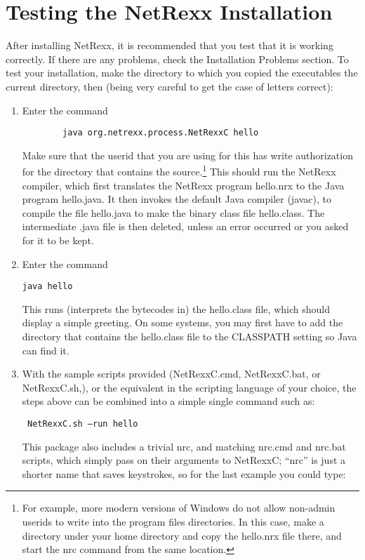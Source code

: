 \section{Testing the NetRexx Installation}\label{testing}
After installing NetRexx, it is recommended that you test that it is working correctly. If there are any problems, check the Installation Problems section. 
To test your installation, make the directory to which you copied the executables the current directory, then (being very careful to get the case of letters correct):
\begin{enumerate}
\item Enter the command
 \begin{verbatim}
        java org.netrexx.process.NetRexxC hello
\end{verbatim}
Make sure that the userid that you are using for this has write
authorization for the directory that contains the source.\footnote{For example,
more modern versions of Windows do not allow non-admin userids to
write into the program files directories. In this case, make a
directory under your home directory and copy the hello.nrx file there,
and start the nrc command from the same location.}
This should run the NetRexx compiler, which first translates the NetRexx program hello.nrx to the Java program hello.java. It then invokes the default Java compiler (javac), to compile the file hello.java to make the binary class file hello.class. The intermediate .java file is then deleted, unless an error occurred or you asked for it to be kept.
\item Enter the command
 \begin{verbatim} 
java hello 
\end{verbatim}
This runs (interprets the bytecodes in) the hello.class file, which should display a simple greeting. On some systems, you may first have to add the directory that contains the hello.class file to the CLASSPATH setting so Java can find it. 
\item With the sample scripts provided (NetRexxC.cmd, NetRexxC.bat, or NetRexxC.sh,), or the equivalent in the scripting language of your choice, the steps above can be combined into a simple single command such as:
  \begin{verbatim}
 NetRexxC.sh –run hello
\end{verbatim}
This package also includes a trivial nrc, and matching nrc.cmd and nrc.bat scripts, which simply pass on their arguments to NetRexxC; “nrc” is just a shorter name that saves keystrokes, so for the last example you could type: 

\end{enumerate}
